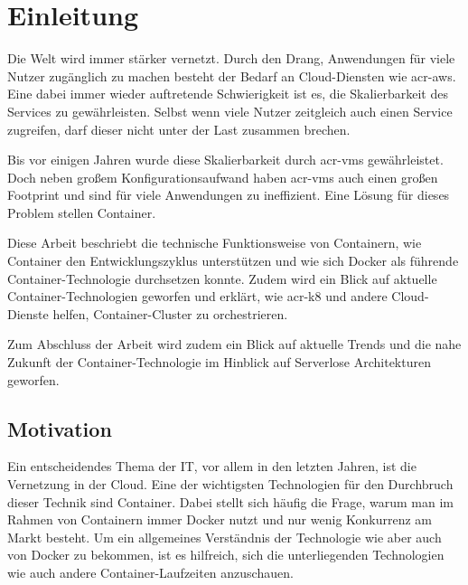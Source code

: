 \chapter{Einleitung}
\label{chap:einleitung}
Die Welt wird immer stärker vernetzt. Durch den Drang, Anwendungen für viele Nutzer zugänglich zu machen besteht der Bedarf an Cloud-Diensten wie \gls{acr-aws}.
Eine dabei immer wieder auftretende Schwierigkeit ist es, die Skalierbarkeit des Services zu gewährleisten. Selbst wenn viele Nutzer zeitgleich auch einen Service zugreifen, darf dieser nicht unter der Last zusammen brechen.

Bis vor einigen Jahren wurde diese Skalierbarkeit durch \glspl{acr-vm} gewährleistet. Doch neben großem Konfigurationsaufwand haben \glspl{acr-vm} auch einen großen Footprint und sind für viele  Anwendungen zu ineffizient. Eine Lösung für dieses Problem stellen Container.

Diese Arbeit beschriebt die technische Funktionsweise von Containern, wie Container den Entwicklungszyklus unterstützen und wie sich Docker als führende Container-Technologie durchsetzen konnte. Zudem wird ein Blick auf aktuelle Container-Technologien geworfen und erklärt, wie \gls{acr-k8} und andere Cloud-Dienste helfen, Container-Cluster zu orchestrieren.

Zum Abschluss der Arbeit wird zudem ein Blick auf aktuelle Trends und die nahe Zukunft der Container-Technologie im Hinblick auf Serverlose Architekturen geworfen. 

\section{Motivation}
\label{sec:motivation}
Ein entscheidendes Thema der IT, vor allem in den letzten Jahren, ist die Vernetzung in der Cloud. Eine der wichtigsten Technologien für den Durchbruch dieser Technik sind Container. Dabei stellt sich häufig die Frage, warum man im Rahmen von Containern immer Docker nutzt und nur wenig Konkurrenz am Markt besteht. Um ein allgemeines Verständnis der Technologie wie aber auch von Docker zu bekommen, ist es hilfreich, sich die unterliegenden Technologien wie auch andere Container-Laufzeiten anzuschauen.